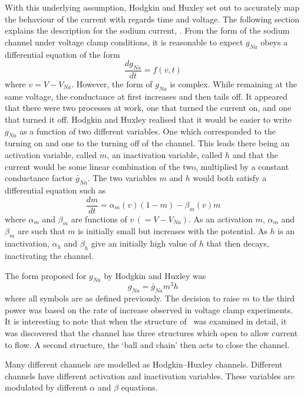 With this underlying assumption, Hodgkin and Huxley set out to accurately map
the behaviour of the current with regards time and voltage.
The following section explains the description for the sodium current, .
From the form of the sodium channel under voltage clamp conditions, it is
reasonable to expect $g_{Na}$ obeys a differential equation of the form
\begin{equation}
\frac{dg_{Na}}{dt} = f\left(v,t\right)
\label{eqn:intro:math:hh2}
\end{equation}
where $v=V-V_{Na}$.
However, the form of $g_{Na}$ is complex.
While remaining at the same voltage, the conductance at first increases and then
tails off.
It appeared that there were two processes at work, one that turned the current
on, and one that turned it off.
Hodgkin and Huxley realised that it would be easier to write $g_{Na}$ as a
function of two different variables.
One which corresponded to the turning on and one to the turning off of the
channel.
This leads there being an activation variable, called $m$, an inactivation
variable, called $h$ and that the current would be some linear combination of the
two, multiplied by a constant conductance factor $\bar{g}_{Na}$.
The two variables $m$ and $h$ would both satisfy a differential equation such as
\begin{equation}
\frac{dm}{dt}=\alpha_{m}\left(v\right)\left(1-m\right) -
\beta_{m}\left(v\right)m
\label{eqn:intro:math:dmdt}
\end{equation}
where $\alpha_{m}$ and $\beta_{m}$ are functions of $v\,\left(=V-V_{Na}\right)$.
As an activation $m$, $\alpha_{m}$ and $\beta_{m}$ are such that $m$ is
initially small but increases with the potential.
As $h$ is an inactivation, $\alpha_{h}$ and $\beta_{h}$ give an initially high
value of $h$ that then decays, inactivating the channel.

The form proposed for $g_{Na}$ by Hodgkin and Huxley was
\begin{equation}
g_{Na}=\bar{g}_{Na}m^{3}h
\label{eqn:intro:math:gna}
\end{equation}
where all symbols are as defined previously.
The decision to raise $m$ to the third power was based on the rate of increase
observed in voltage clamp experiments.
It is interesting to note that when the structure of \ was examined in
detail, it was discovered that the channel has three structures which open to
allow current to flow.
A second structure, the `ball and chain' then acts to close the channel.

Many different channels are modelled as Hodgkin--Huxley channels.
Different channels have different activation and inactivation variables.
These variables are modulated by different $\alpha$ and $\beta$ equations.

